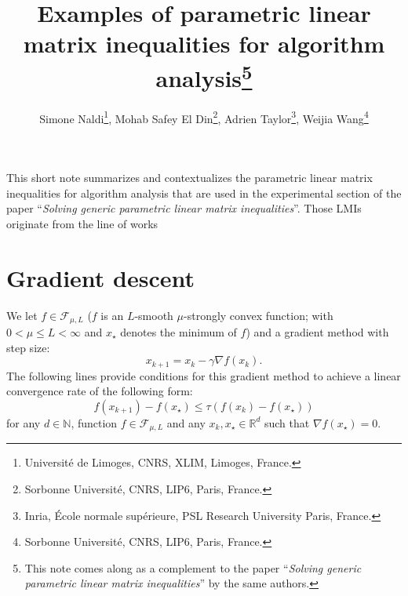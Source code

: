 \documentclass{article}
\title{Examples of parametric linear matrix inequalities for algorithm analysis\footnote{This note comes along as a complement to the paper ``\emph{Solving generic parametric linear matrix inequalities}'' by the same authors.}}
\author{Simone Naldi\footnote{Université de Limoges, CNRS, XLIM,
Limoges, France.}, Mohab Safey El Din\footnote{Sorbonne Université, CNRS, LIP6, Paris, France.}, Adrien Taylor\footnote{Inria, \'Ecole normale sup\'erieure, PSL Research University Paris, France.}, Weijia Wang\footnote{Sorbonne Université, CNRS, LIP6, Paris, France.}}
\renewcommand{\leq}{\leqslant}
\begin{document}
\maketitle

This short note summarizes and contextualizes the parametric linear matrix inequalities for algorithm analysis that are used in the experimental section of the paper ``\emph{Solving generic parametric linear matrix inequalities}''. Those LMIs originate from the line of works~\cite{drori2014performance,taylor2017exact,taylor2017smooth,ryu2020operator}

\section{Gradient descent}
We let $f\in\mathcal{F}_{\mu,L}$ ($f$ is an $L$-smooth $\mu$-strongly convex function; with $0< \mu \leq L<\infty$ and $x_\star$ denotes the minimum of $f$) and a gradient method with step size:
\[x_{k+1}=x_k-\gamma\nabla f(x_k).\]
The following lines provide conditions for this gradient method to achieve a linear convergence rate of the following form:
\begin{equation}\label{eq:GD_conv_func}
f(x_{k+1})-f(x_\star)\leq \tau \left(f(x_k)-f(x_\star)\right)
\end{equation}
for any $d\in\mathbb{N}$, function $f\in\mathcal{F}_{\mu,L}$ and any $x_k,x_\star\in\mathbb{R}^d$ such that $\nabla f(x_\star)=0$.
\end{document}
